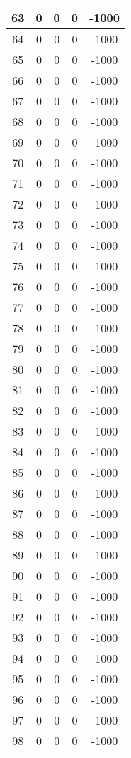 \documentclass[letterpaper, 12pt]{article}
\begin{document}
\begin{longtable}{|c|c|c|c|c|}
\hline
63 & 0 & 0 & 0 & -1000 \\
\hline
64 & 0 & 0 & 0 & -1000 \\
\hline
65 & 0 & 0 & 0 & -1000 \\
\hline
66 & 0 & 0 & 0 & -1000 \\
\hline
67 & 0 & 0 & 0 & -1000 \\
\hline
68 & 0 & 0 & 0 & -1000 \\
\hline
69 & 0 & 0 & 0 & -1000 \\
\hline
70 & 0 & 0 & 0 & -1000 \\
\hline
71 & 0 & 0 & 0 & -1000 \\
\hline
72 & 0 & 0 & 0 & -1000 \\
\hline
73 & 0 & 0 & 0 & -1000 \\
\hline
74 & 0 & 0 & 0 & -1000 \\
\hline
75 & 0 & 0 & 0 & -1000 \\
\hline
76 & 0 & 0 & 0 & -1000 \\
\hline
77 & 0 & 0 & 0 & -1000 \\
\hline
78 & 0 & 0 & 0 & -1000 \\
\hline
79 & 0 & 0 & 0 & -1000 \\
\hline
80 & 0 & 0 & 0 & -1000 \\
\hline
81 & 0 & 0 & 0 & -1000 \\
\hline
82 & 0 & 0 & 0 & -1000 \\
\hline
83 & 0 & 0 & 0 & -1000 \\
\hline
84 & 0 & 0 & 0 & -1000 \\
\hline
85 & 0 & 0 & 0 & -1000 \\
\hline
86 & 0 & 0 & 0 & -1000 \\
\hline
87 & 0 & 0 & 0 & -1000 \\
\hline
88 & 0 & 0 & 0 & -1000 \\
\hline
89 & 0 & 0 & 0 & -1000 \\
\hline
90 & 0 & 0 & 0 & -1000 \\
\hline
91 & 0 & 0 & 0 & -1000 \\
\hline
92 & 0 & 0 & 0 & -1000 \\
\hline
93 & 0 & 0 & 0 & -1000 \\
\hline
94 & 0 & 0 & 0 & -1000 \\
\hline
95 & 0 & 0 & 0 & -1000 \\
\hline
96 & 0 & 0 & 0 & -1000 \\
\hline
97 & 0 & 0 & 0 & -1000 \\
\hline
98 & 0 & 0 & 0 & -1000 \\

\end{longtable}
\end{document}

